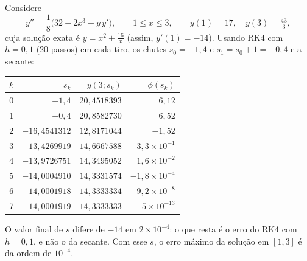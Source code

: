\begin{exemplo}
Considere
\[
y''=\frac{1}{8}\bigl(32+2x^3-y\,y'\bigr),\qquad 1\le x\le3,\qquad y(1)=17,\quad y(3)=\tfrac{43}{3},
\]
cuja solução exata é $y=x^2+\frac{16}{x}$ (assim, $y'(1)=-14$). Usando RK4 com $h=0{,}1$
(20 passos) em cada tiro, os chutes $s_0=-1{,}4$ e $s_1=s_0+1=-0{,}4$ e a secante:
\begin{center}
\renewcommand{\arraystretch}{1.25}
\begin{tabular}{c|r|r|r}
$k$ & $s_k$ & $y(3;s_k)$ & $\phi(s_k)$\\ \hline
0 & $-1{,}4$ & $20{,}4518393$ & $6{,}12$\\
1 & $-0{,}4$ & $20{,}8582730$ & $6{,}52$\\
2 & $-16{,}4541312$ & $12{,}8171044$ & $-1{,}52$\\
3 & $-13{,}4269919$ & $14{,}6667588$ & $3{,}3\times10^{-1}$\\
4 & $-13{,}9726751$ & $14{,}3495052$ & $1{,}6\times10^{-2}$\\
5 & $-14{,}0004910$ & $14{,}3331574$ & $-1{,}8\times10^{-4}$\\
6 & $-14{,}0001918$ & $14{,}3333334$ & $9{,}2\times10^{-8}$\\
7 & $-14{,}0001919$ & $14{,}3333333$ & $5\times10^{-13}$
\end{tabular}
\end{center}
O valor final de $s$ difere de $-14$ em $2\times10^{-4}$: o que resta é o erro do RK4 com
$h=0{,}1$, e não o da secante. Com esse $s$, o erro máximo da solução em $[1,3]$ é da ordem
de $10^{-4}$.
\end{exemplo}

